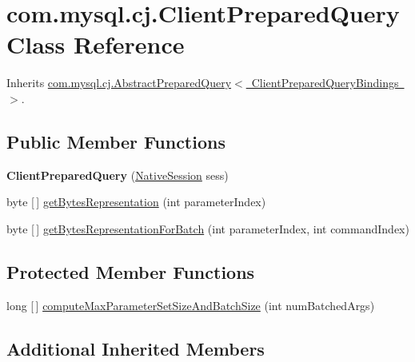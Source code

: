 \hypertarget{classcom_1_1mysql_1_1cj_1_1_client_prepared_query}{}\section{com.\+mysql.\+cj.\+Client\+Prepared\+Query Class Reference}
\label{classcom_1_1mysql_1_1cj_1_1_client_prepared_query}


Inherits \mbox{\hyperlink{classcom_1_1mysql_1_1cj_1_1_abstract_prepared_query}{com.\+mysql.\+cj.\+Abstract\+Prepared\+Query$<$ Client\+Prepared\+Query\+Bindings $>$}}.

\subsection*{Public Member Functions}
\begin{DoxyCompactItemize}
\item 
\mbox{\label{classcom_1_1mysql_1_1cj_1_1_client_prepared_query_a61b8c76c05ef30b155a9b86c302f7876}} 
{\bfseries Client\+Prepared\+Query} (\mbox{\hyperlink{classcom_1_1mysql_1_1cj_1_1_native_session}{Native\+Session}} sess)
\item 
byte \mbox{[}$\,$\mbox{]} \mbox{\hyperlink{classcom_1_1mysql_1_1cj_1_1_client_prepared_query_af02746970c69db882201f0613d22084a}{get\+Bytes\+Representation}} (int parameter\+Index)
\item 
byte \mbox{[}$\,$\mbox{]} \mbox{\hyperlink{classcom_1_1mysql_1_1cj_1_1_client_prepared_query_a591dea27c5fc2a48b36978c8c23a92de}{get\+Bytes\+Representation\+For\+Batch}} (int parameter\+Index, int command\+Index)
\end{DoxyCompactItemize}
\subsection*{Protected Member Functions}
\begin{DoxyCompactItemize}
\item 
long \mbox{[}$\,$\mbox{]} \mbox{\hyperlink{classcom_1_1mysql_1_1cj_1_1_client_prepared_query_aa235acebc5003992485e6d8f2b138686}{compute\+Max\+Parameter\+Set\+Size\+And\+Batch\+Size}} (int num\+Batched\+Args)
\end{DoxyCompactItemize}
\subsection*{Additional Inherited Members}


